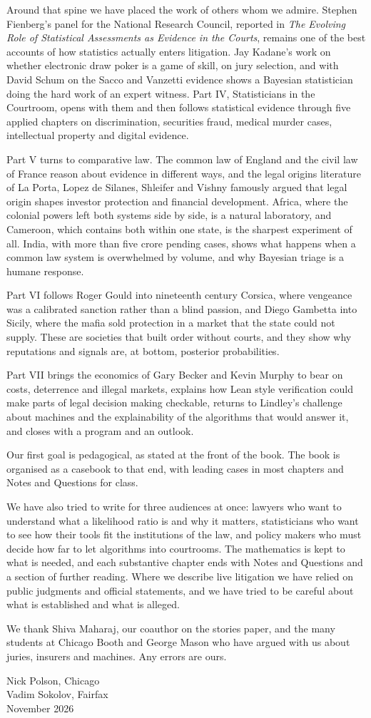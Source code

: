 Around that spine we have placed the work of others whom we admire. Stephen Fienberg's panel for the National Research Council, reported in \emph{The Evolving Role of Statistical Assessments as Evidence in the Courts}, remains one of the best accounts of how statistics actually enters litigation. Jay Kadane's work on whether electronic draw poker is a game of skill, on jury selection, and with David Schum on the Sacco and Vanzetti evidence shows a Bayesian statistician doing the hard work of an expert witness. Part IV, Statisticians in the Courtroom, opens with them and then follows statistical evidence through five applied chapters on discrimination, securities fraud, medical murder cases, intellectual property and digital evidence.

Part V turns to comparative law. The common law of England and the civil law of France reason about evidence in different ways, and the legal origins literature of La Porta, Lopez de Silanes, Shleifer and Vishny famously argued that legal origin shapes investor protection and financial development. Africa, where the colonial powers left both systems side by side, is a natural laboratory, and Cameroon, which contains both within one state, is the sharpest experiment of all. India, with more than five crore pending cases, shows what happens when a common law system is overwhelmed by volume, and why Bayesian triage is a humane response.

Part VI follows Roger Gould into nineteenth century Corsica, where vengeance was a calibrated sanction rather than a blind passion, and Diego Gambetta into Sicily, where the mafia sold protection in a market that the state could not supply. These are societies that built order without courts, and they show why reputations and signals are, at bottom, posterior probabilities.

Part VII brings the economics of Gary Becker and Kevin Murphy to bear on costs, deterrence and illegal markets, explains how Lean style verification could make parts of legal decision making checkable, returns to Lindley's challenge about machines and the explainability of the algorithms that would answer it, and closes with a program and an outlook.

Our first goal is pedagogical, as stated at the front of the book. The book is organised as a casebook to that end, with leading cases in most chapters and Notes and Questions for class.

We have also tried to write for three audiences at once: lawyers who want to understand what a likelihood ratio is and why it matters, statisticians who want to see how their tools fit the institutions of the law, and policy makers who must decide how far to let algorithms into courtrooms. The mathematics is kept to what is needed, and each substantive chapter ends with Notes and Questions and a section of further reading. Where we describe live litigation we have relied on public judgments and official statements, and we have tried to be careful about what is established and what is alleged.

We thank Shiva Maharaj, our coauthor on the stories paper, and the many students at Chicago Booth and George Mason who have argued with us about juries, insurers and machines. Any errors are ours.

\medskip
\noindent Nick Polson, Chicago\\
Vadim Sokolov, Fairfax\\
November 2026
